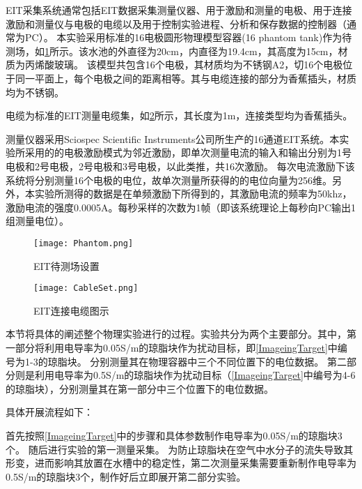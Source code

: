 EIT采集系统通常包括EIT数据采集测量仪器、用于激励和测量的电极、用于连接激励和测量仪与电极的电缆以及用于控制实验进程、分析和保存数据的控制器（通常为PC）。
本实验采用标准的16电极圆形物理模型容器(16 phantom tank)作为待测场，如\cref{figure:Phantom}所示。该水池的外直径为20cm，内直径为19.4cm，其高度为15cm，材质为丙烯酸玻璃。
该模型共包含16个电极，其材质均为不锈钢A2，切16个电极位于同一平面上，每个电极之间的距离相等。其与电缆连接的部分为香蕉插头，材质均为不锈钢。

电缆为标准的EIT测量电缆集，如\cref{figure:CableSet}所示，其长度为1m，连接类型均为香蕉插头。

测量仪器采用Sciospec Scientific Instruments公司所生产的16通道EIT系统。本实验所采用的的电极激励模式为邻近激励，即单次测量电流的输入和输出分别为1号电极和2号电极，2号电极和3号电极，以此类推，共16次激励。
每次电流激励下该系统将分别测量16个电极的电位，故单次测量所获得的的电位向量为256维。另外，本实验所测得的数据是在单频激励下所得到的，其激励电流的频率为50khz，
激励电流的强度0.0005A。每秒采样的次数为1帧（即该系统理论上每秒向PC输出1组测量电位）。

\begin{figure}
    \centering
    \texttt{[image: Phantom.png]}
    \caption{EIT待测场设置}
    \label{figure:Phantom}
\end{figure}

\begin{figure}
    \centering
    \texttt{[image: CableSet.png]}
    \caption{EIT连接电缆图示}
    \label{figure:CableSet}
\end{figure}
    


本节将具体的阐述整个物理实验进行的过程。实验共分为两个主要部分。其中，第一部分将利用电导率为0.05S/m的琼脂块作为扰动目标，即\cref{ImageingTarget}中编号为1-3的琼脂块。
分别测量其在物理容器中三个不同位置下的电位数据。
第二部分则是利用电导率为0.5S/m的琼脂块作为扰动目标（\cref{ImageingTarget}中编号为4-6的琼脂块），分别测量其在第一部分中三个位置下的电位数据。

具体开展流程如下：

首先按照\cref{ImageingTarget}中的步骤和具体参数制作电导率为0.05S/m的琼脂块3个。
随后进行实验的第一测量采集。
为防止琼脂块在空气中水分子的流失导致其形变，进而影响其放置在水槽中的稳定性，第二次测量采集需要重新制作电导率为0.5S/m的琼脂块3个，制作好后立即展开第二部分实验。

